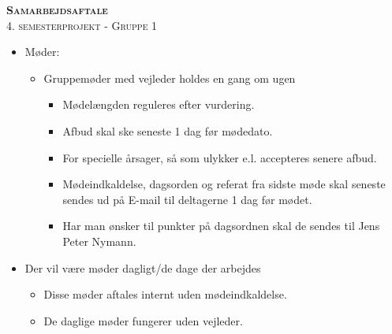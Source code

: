 
\newcommand{\HRule}{\rule{\linewidth}{0.1mm}}


	\begin{center}
		{\Huge \bfseries \textsc{Samarbejdsaftale}}\\
		\textsc{\large 4. semesterprojekt - Gruppe 1}\\[0.3cm]
	\end{center}
\hfill
	\begin{itemize}
		\item Møder:
			\begin{itemize}
				\item Gruppemøder med vejleder holdes en gang om ugen
				\begin{itemize}
				\item Mødelængden reguleres efter vurdering.
				\item Afbud skal ske seneste 1 dag før mødedato.
				\item For specielle årsager, så som ulykker e.l. accepteres senere afbud.
				\item Mødeindkaldelse, dagsorden og referat fra sidste møde skal seneste sendes ud på E-mail til deltagerne 1 dag før mødet.
				\item Har man ønsker til punkter på dagsordnen skal de sendes til Jens Peter Nymann.
				\end{itemize}
			\end{itemize}
	
		\item Der vil være møder dagligt/de dage der arbejdes
			\begin{itemize}
				\item Disse møder aftales internt uden mødeindkaldelse. 
				\item De daglige møder fungerer uden vejleder.
			\end{itemize}
		

\end{itemize}
